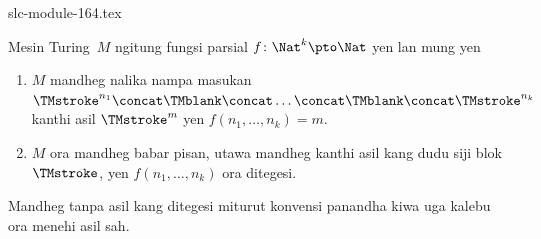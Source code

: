 \begin{filecontents*}[overwrite]{slc-module-164.tex}
\begin{defn}
  Mesin Turing~$M$ ngitung fungsi parsial $f\colon \Nat^k
  \pto \Nat$ yen lan mung yen
  \begin{enumerate}
    \item $M$ mandheg nalika nampa masukan $\TMstroke^{n_1}\concat\TMblank\concat
    \dots \concat\TMblank\concat\TMstroke^{n_k}$ kanthi asil $\TMstroke^{m}$ yen $f(n_1, \dots, n_k) = m$.
    \item $M$ ora mandheg babar pisan, utawa mandheg kanthi
    asil kang dudu siji blok~$\TMstroke$, yen
    $f(n_1, \dots, n_k)$ ora ditegesi.
  \end{enumerate}
Mandheg tanpa asil kang ditegesi miturut konvensi panandha kiwa uga kalebu ora menehi asil sah.
\end{defn}


\end{filecontents*}

